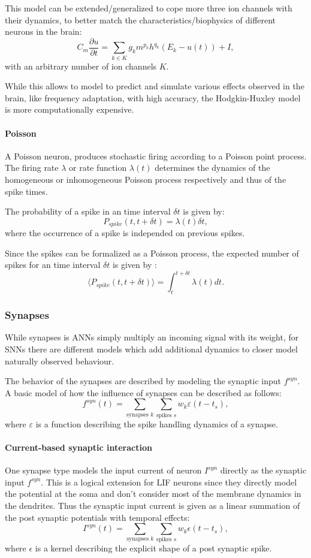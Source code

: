 This model can be extended/generalized to cope more three ion channels with their dynamics, to better match the characteristics/biophysics of different neurons in the brain:
\[
C_m \frac{\partial u}{\partial t} = \sum_{k \in K} g_k m^{p_k} h^{q_k} (E_k - u(t)) + I,
\]
with an arbitrary number of ion channels $K$.

While this allows to model to predict and simulate various effects observed in the brain, like frequency adaptation, with high accuracy, the Hodgkin-Huxley model is more computationally expensive.

\paragraph{Poisson}

A Poisson neuron, produces stochastic firing according to a Poisson point process.
The firing rate $\lambda$ or rate function $\lambda(t)$ determines the dynamics of the homogeneous or inhomogeneous Poisson process respectively and thus of the spike times.   

The probability of a spike in an time interval $\delta t$ is given by: 
\[
P_{spike}({t , t+ \delta t}) = \lambda(t) \delta t,
\]
where the occurrence of a spike is independed on previous spikes. 

Since the spikes can be formalized as a Poisson process, the expected number of spikes for an time interval $\delta t$ is given by :
\[
\langle  P_{spike}({t , t+ \delta t}) \rangle = \int_t^{t + \delta t} \lambda(t) dt.
\]


\subsubsection{Synapses}

While synapses is ANNs simply multiply an incoming signal with its weight, for SNNs there are different models which add additional dynamics to closer model naturally observed behaviour. 

The behavior of the synapses are described by modeling the synaptic input $f^{syn}$. A basic model of how the influence of synapses can be described as follows:
\[
f^{syn}(t) = \sum_{\text{synapses } k } \sum_{\text{spikes } s} w_k \varepsilon(t - t_s),
\]
where $\varepsilon$ is a function describing the spike handling dynamics of a synapse.

\paragraph{Current-based synaptic interaction} One synapse type models the input current of neuron $I^{syn}$ directly as the synaptic input $f^{syn}$. This is a logical extension for LIF neurons since they directly model the potential at the soma and don't consider most of the membrane dynamics in the dendrites. 
Thus the synaptic input current is given as a linear summation of the post synaptic potentials with temporal effects:
\[
I^{syn}(t) = \sum_{\text{synapses } k } \sum_{\text{spikes } s} w_k \epsilon(t - t_s),
\]
where $\epsilon$ is a kernel describing the explicit shape of a post synaptic spike.

